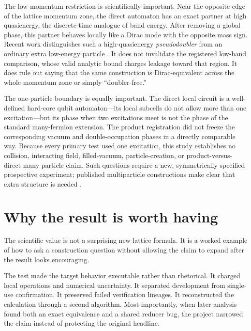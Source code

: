 \documentclass[11pt]{article}
\begin{document}
The low-momentum restriction is scientifically important.  Near the opposite
edge of the lattice momentum zone, the direct automaton has an exact partner at
high quasienergy, the discrete-time analogue of band energy.  After removing a
global phase, this partner behaves locally
like a Dirac mode with the opposite mass sign.  Recent work distinguishes such
a high-quasienergy \emph{pseudodoubler} from an ordinary extra low-energy
particle \citep{Gupta2026FermionDoubling,Gupta2025DiracVacuum}.  It does not
invalidate the registered low-band comparison, whose valid analytic bound
charges leakage toward that region.  It does rule out saying that the same
construction is Dirac-equivalent across the whole momentum zone or simply
``doubler-free.''

The one-particle boundary is equally important.  The direct local circuit is a
well-defined hard-core qubit automaton---its local subcells do not allow more
than one excitation---but its phase
when two excitations meet is not the phase of the standard many-fermion
extension.  The
product registration did not freeze the corresponding vacuum and
double-occupation phases in a directly comparable way.  Because every primary
test used one excitation, this study establishes no collision, interacting
field, filled-vacuum, particle-creation, or product-versus-direct many-particle
claim.  Such questions require a new, symmetrically specified prospective
experiment; published multiparticle constructions make clear that extra
structure is needed \citep{Farrelly2014CausalFermions,Mlodinow2020QFTQCA}.

\section{Why the result is worth having}

The scientific value is not a surprising new lattice formula.  It is a worked
example of how to ask a construction question without allowing the claim to
expand after the result looks encouraging.

The test made the target behavior executable rather than rhetorical.  It
charged local operations and numerical uncertainty.  It separated development
from single-use confirmation.  It preserved failed verification lineages.  It
reconstructed the calculation through a second algorithm.  Most importantly,
when later analysis found both an exact equivalence and a shared reducer bug,
the project narrowed the claim instead of protecting the original headline.
\end{document}
